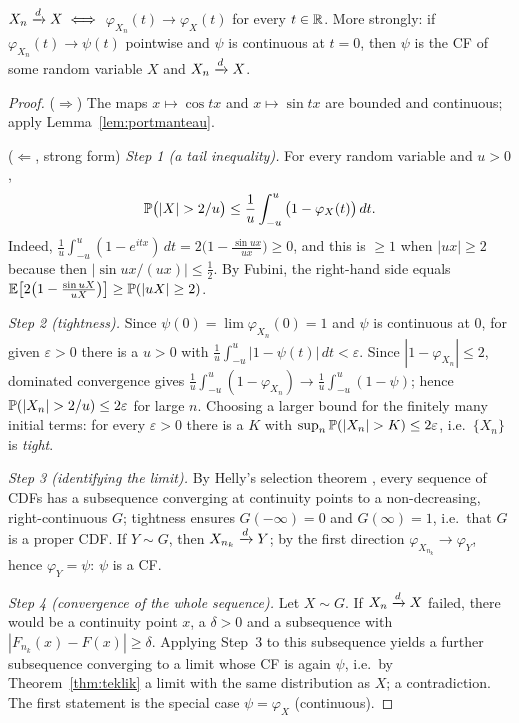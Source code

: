 \documentclass[main.tex]{subfiles}
\begin{document}
\begin{theorem}\label{thm:levy}
$X_n\xrightarrow{d} X\iff$ $\varphi_{X_n}(t)\to\varphi_X(t)$ for every $t\in\mathbb{R}$. More strongly: if $\varphi_{X_n}(t)\to\psi(t)$ pointwise and $\psi$ is continuous at $t=0$, then $\psi$ is the CF of some random variable $X$ and $X_n\xrightarrow{d} X$.
\end{theorem}
\begin{proof}
($\Rightarrow$) The maps $x\mapsto\cos tx$ and $x\mapsto\sin tx$ are bounded and continuous; apply Lemma~\ref{lem:portmanteau}.

($\Leftarrow$, strong form) \emph{Step 1 (a tail inequality).} For every random variable and $u>0$,
\[
\P\big(|X|>2/u\big)\le\frac1u\int_{-u}^{u}\big(1-\varphi_X(t)\big)\,dt .
\]
Indeed, $\frac1u\int_{-u}^{u}(1-e^{itx})\,dt=2\big(1-\frac{\sin ux}{ux}\big)\ge0$, and this is $\ge1$ when $|ux|\ge2$ because then $|\sin ux/(ux)|\le\frac12$. By Fubini, the right-hand side equals $\mathbb{E}\big[2\big(1-\frac{\sin uX}{uX}\big)\big]\ge\mathbb{P}(|uX|\ge2)$.

\emph{Step 2 (tightness).} Since $\psi(0)=\lim\varphi_{X_n}(0)=1$ and $\psi$ is continuous at $0$, for given $\varepsilon>0$ there is a $u>0$ with $\frac1u\int_{-u}^u|1-\psi(t)|\,dt<\varepsilon$. Since $|1-\varphi_{X_n}|\le2$, dominated convergence gives $\frac1u\int_{-u}^u(1-\varphi_{X_n})\to\frac1u\int_{-u}^u(1-\psi)$; hence $\P(|X_n|>2/u)\le2\varepsilon$ for large $n$. Choosing a larger bound for the finitely many initial terms: for every $\varepsilon>0$ there is a $K$ with $\sup_n\P(|X_n|>K)\le2\varepsilon$, i.e.\ $\{X_n\}$ is \emph{tight}.

\emph{Step 3 (identifying the limit).} By Helly's selection theorem \cite[Theorem~25.9]{billingsley}, every sequence of CDFs has a subsequence converging at continuity points to a non-decreasing, right-continuous $G$; tightness ensures $G(-\infty)=0$ and $G(\infty)=1$, i.e.\ that $G$ is a proper CDF. If $Y\sim G$, then $X_{n_k}\xrightarrow{d} Y$; by the first direction $\varphi_{X_{n_k}}\to\varphi_Y$, hence $\varphi_Y=\psi$: $\psi$ is a CF.

\emph{Step 4 (convergence of the whole sequence).} Let $X\sim G$. If $X_n\xrightarrow{d} X$ failed, there would be a continuity point $x$, a $\delta>0$ and a subsequence with $|F_{n_k}(x)-F(x)|\ge\delta$. Applying Step~3 to this subsequence yields a further subsequence converging to a limit whose CF is again $\psi$, i.e.\ by Theorem~\ref{thm:teklik} a limit with the same distribution as $X$; a contradiction. The first statement is the special case $\psi=\varphi_X$ (continuous).
\end{proof}
\end{document}
